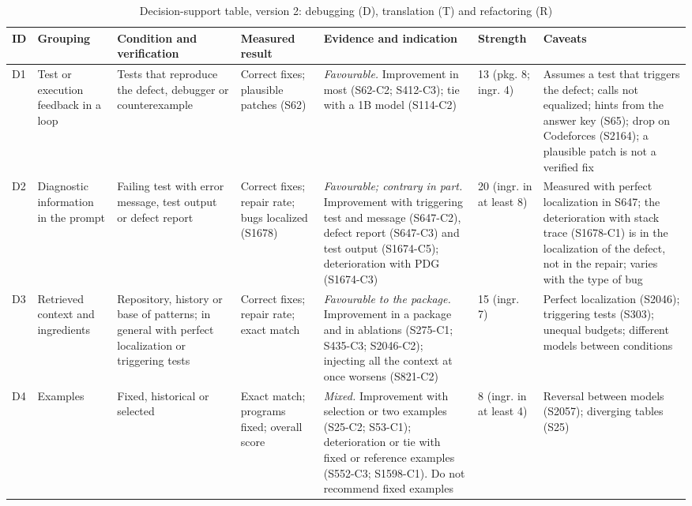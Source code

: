 \begin{table}[!tp]
\caption{Decision-support table, version 2: debugging (D), translation (T) and refactoring (R)}\label{tab:apoiob}
\centering
\fontsize{6.6}{7.4}\selectfont
\renewcommand{\arraystretch}{0.95}
\setlength{\tabcolsep}{2.5pt}
\renewcommand*{\rr}{\raggedright\hspace{0pt}}
\begin{tabular}{p{0.55cm}p{2.0cm}p{2.4cm}p{1.9cm}p{5.6cm}p{1.6cm}p{3.1cm}}
\hline
\rr\textbf{ID} & \rr\textbf{Grouping} & \rr\textbf{Condition and verification} & \rr\textbf{Measured result} & \rr\textbf{Evidence and indication} & \rr\textbf{Strength} & \rr\textbf{Caveats}\tabularnewline
\hline
\rr D1 & \rr Test or execution feedback in a loop & \rr Tests that reproduce the defect, debugger or counterexample & \rr Correct fixes; plausible patches (S62) & \rr \textit{Favourable.} Improvement in most (S62-C2; S412-C3); tie with a 1B model (S114-C2) & \rr 13 (pkg. 8; ingr. 4) & \rr Assumes a test that triggers the defect; calls not equalized; hints from the answer key (S65); drop on Codeforces (S2164); a plausible patch is not a verified fix\tabularnewline
\rr D2 & \rr Diagnostic information in the prompt & \rr Failing test with error message, test output or defect report & \rr Correct fixes; repair rate; bugs localized (S1678) & \rr \textit{Favourable; contrary in part.} Improvement with triggering test and message (S647-C2), defect report (S647-C3) and test output (S1674-C5); deterioration with PDG (S1674-C3) & \rr 20 (ingr. in at least 8) & \rr Measured with perfect localization in S647; the deterioration with stack trace (S1678-C1) is in the localization of the defect, not in the repair; varies with the type of bug\tabularnewline
\rr D3 & \rr Retrieved context and ingredients & \rr Repository, history or base of patterns; in general with perfect localization or triggering tests & \rr Correct fixes; repair rate; exact match & \rr \textit{Favourable to the package.} Improvement in a package and in ablations (S275-C1; S435-C3; S2046-C2); injecting all the context at once worsens (S821-C2) & \rr 15 (ingr. 7) & \rr Perfect localization (S2046); triggering tests (S303); unequal budgets; different models between conditions\tabularnewline
\rr D4 & \rr Examples & \rr Fixed, historical or selected & \rr Exact match; programs fixed; overall score & \rr \textit{Mixed.} Improvement with selection or two examples (S25-C2; S53-C1); deterioration or tie with fixed or reference examples (S552-C3; S1598-C1). Do not recommend fixed examples & \rr 8 (ingr. in at least 4) & \rr Reversal between models (S2057); diverging tables (S25)\tabularnewline

\end{tabular}
\end{table}
